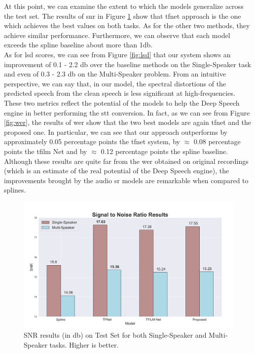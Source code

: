 \noindent At this point, we can examine the extent to which the models generalize across the test set. The results of \gls{snr} in Figure \ref{fig:snr} show that \gls{tfnet} approach is the one which achieves the best values on both tasks. As for the other two methods, they achieve similar performance. Furthermore, we can observe that each model exceeds the spline baseline about more than 1\gls{db}. \\
As for \gls{lsd} scores, we can see from Figure \ref{fig:lsd} that our system shows an improvement of 0.1 - 2.2 \gls{db} over the baseline methods on the Single-Speaker task and even of 0.3 - 2.3 \gls{db} on the Multi-Speaker problem. From an intuitive perspective, we can say that, in our model, the spectral distortions of the predicted speech from the clean speech is less significant at high-frequencies. \\
These two metrics reflect the potential of the models to help the Deep Speech engine in better performing the \gls{stt} conversion. In fact, as we can see from Figure \ref{fig:wer}, the results of \gls{wer} show that the two best models are again \gls{tfnet} and the proposed one. In particular, we can see that our approach outperforms by approximately 0.05 percentage points the \gls{tfnet} system, by $\approx$ 0.08 percentage points the \gls{tfilm} Net and by $\approx$ 0.12 percentage points the spline baseline. Although these results are quite far from the \gls{wer} obtained on original recordings (which is an estimate of the real potential of the Deep Speech engine), the improvements brought by the audio \gls{sr} models are remarkable when compared to splines.\\
\begin{figure}[H]
	\begin{center}
		\includegraphics[scale=0.4]{img/snr_results.png}
		\caption{SNR results (in \gls{db}) on Test Set for both Single-Speaker and Multi-Speaker tasks. Higher is better.}
		\label{fig:snr}
	\end{center}
\end{figure}

